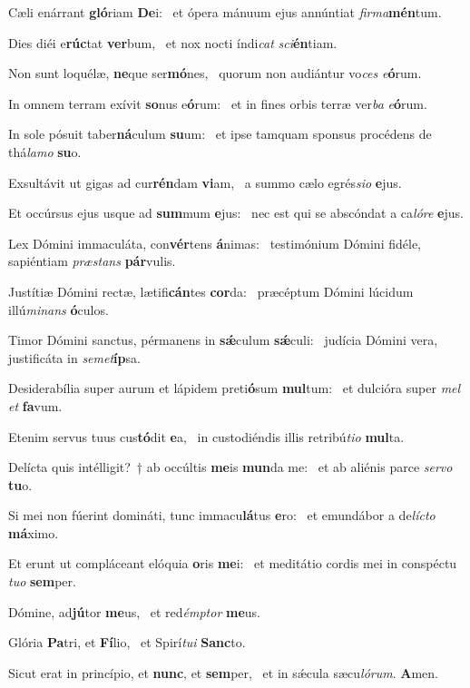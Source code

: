 \item Cæli enárrant \textbf{gló}riam \textbf{De}i:~\psstar{} et ópera mánuum ejus annúntiat \textit{firma}\textbf{mén}tum.
\item Dies diéi e\textbf{rúc}tat \textbf{ver}bum,~\psstar{} et nox nocti índi\textit{cat} \textit{sci}\textbf{én}tiam.
\item Non sunt loquélæ, \textbf{ne}que ser\textbf{mó}nes,~\psstar{} quorum non audiántur vo\textit{ces} \textit{e}\textbf{ó}rum.
\item In omnem terram exívit \textbf{so}nus e\textbf{ó}rum:~\psstar{} et in fines orbis terræ ver\textit{ba} \textit{e}\textbf{ó}rum.
\item In sole pósuit taber\textbf{ná}culum \textbf{su}um:~\psstar{} et ipse tamquam sponsus procédens de thá\textit{lamo} \textbf{su}o.
\item Exsultávit ut gigas ad cur\textbf{rén}dam \textbf{vi}am,~\psstar{} a summo cælo egrés\textit{sio} \textbf{e}jus.
\item Et occúrsus ejus usque ad \textbf{sum}mum \textbf{e}jus:~\psstar{} nec est qui se abscóndat a ca\textit{lóre} \textbf{e}jus.
\item Lex Dómini immaculáta, con\textbf{vér}tens \textbf{á}nimas:~\psstar{} testimónium Dómini fidéle, sapiéntiam \textit{præstans} \textbf{pár}vulis.
\item Justítiæ Dómini rectæ, lætifi\textbf{cán}tes \textbf{cor}da:~\psstar{} præcéptum Dómini lúcidum illú\textit{minans} \textbf{ó}culos.
\item Timor Dómini sanctus, pérmanens in \textbf{sǽ}culum \textbf{sǽ}culi:~\psstar{} judícia Dómini vera, justificáta in \textit{semet}\textbf{íp}sa.
\item Desiderabília super aurum et lápidem preti\textbf{ó}sum \textbf{mul}tum:~\psstar{} et dulcióra super \textit{mel} \textit{et} \textbf{fa}vum.
\item Etenim servus tuus cus\textbf{tó}dit \textbf{e}a,~\psstar{} in custodiéndis illis retribú\textit{tio} \textbf{mul}ta.
\item Delícta quis intélligit?~† ab occúltis \textbf{me}is \textbf{mun}da me:~\psstar{} et ab aliénis parce \textit{servo} \textbf{tu}o.
\item Si mei non fúerint domináti, tunc immacu\textbf{lá}tus \textbf{e}ro:~\psstar{} et emundábor a de\textit{lícto} \textbf{má}ximo.
\item Et erunt ut compláceant elóquia \textbf{o}ris \textbf{me}i:~\psstar{} et meditátio cordis mei in conspéctu \textit{tuo} \textbf{sem}per.
\item Dómine, ad\textbf{jú}tor \textbf{me}us,~\psstar{} et red\textit{émptor} \textbf{me}us.
\item Glória \textbf{Pa}tri, et \textbf{Fí}lio,~\psstar{} et Spirí\textit{tui} \textbf{Sanc}to.
\item Sicut erat in princípio, et \textbf{nunc}, et \textbf{sem}per,~\psstar{} et in sǽcula sæcu\textit{lórum}. \textbf{A}men.